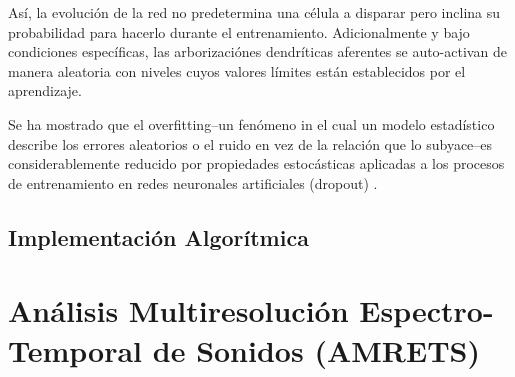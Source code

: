 
Así, la evolución de la red no predetermina una célula a disparar pero inclina su probabilidad para hacerlo durante el entrenamiento. Adicionalmente y bajo condiciones específicas, las arborizaciónes dendríticas aferentes se auto-activan de manera aleatoria con niveles cuyos valores límites están establecidos por el aprendizaje.


Se ha mostrado que el overfitting--un fenómeno in el cual un modelo estadístico describe los errores aleatorios o el ruido en vez de la relación que lo subyace--es considerablemente reducido por propiedades estocásticas aplicadas a los procesos de entrenamiento en redes neuronales artificiales (dropout) \cite{JMLR:v15:srivastava14a}.






\subsection{Implementación Algorítmica}

\section{Análisis Multiresolución Espectro-Temporal de Sonidos (AMRETS)}
\label{mrstsa}

